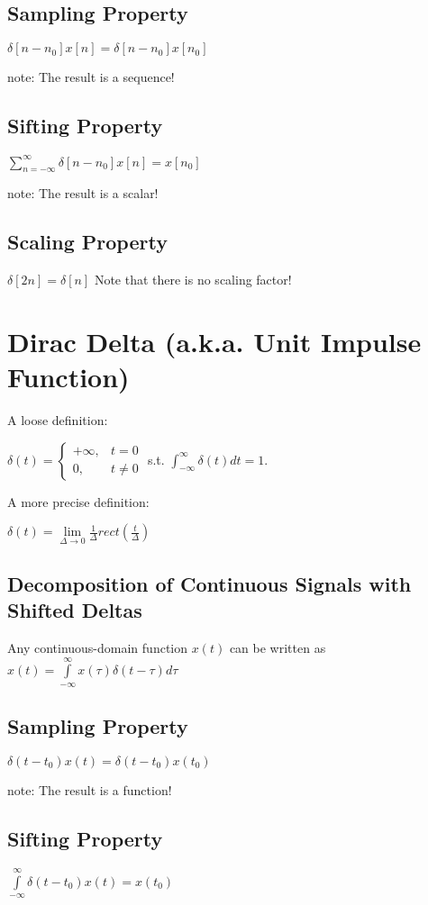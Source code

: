 \documentclass[11pt]{article}
\begin{document}
\subsection{Sampling Property}
$\delta[n-n_0]x[n] = \delta[n-n_0]x[n_0]$

note: The result is a sequence!

\subsection{Sifting Property}
$\sum\limits_{n=-\infty}^\infty \delta[n-n_0]x[n] = x[n_0]$

note: The result is a scalar!

\subsection{Scaling Property}
$\delta[2n]=\delta[n]$ Note that there is no scaling factor!

\section{Dirac Delta (a.k.a. Unit Impulse Function)}

A loose definition:

$\delta(t) = \begin{cases} +\infty,& t = 0 \\ 0, & t \neq 0 \end{cases}$ \quad  s.t. $\int_{-\infty}^\infty \delta(t) dt = 1$.


A more precise definition:

$\delta(t) = \lim\limits_{\Delta\rightarrow 0} \frac{1}{\Delta} rect(\frac{t}{\Delta})$

\subsection{Decomposition of Continuous Signals with Shifted Deltas}
Any continuous-domain function $x(t)$ can be written as $x(t)=\int\limits_{-\infty}^\infty x(\tau)\delta(t-\tau)d\tau$

\subsection{Sampling Property}
$\delta(t-t_0)x(t) = \delta(t-t_0)x(t_0)$

note: The result is a function!

\subsection{Sifting Property}
$\int\limits_{-\infty}^\infty \delta(t-t_0)x(t) = x(t_0)$
\end{document}
